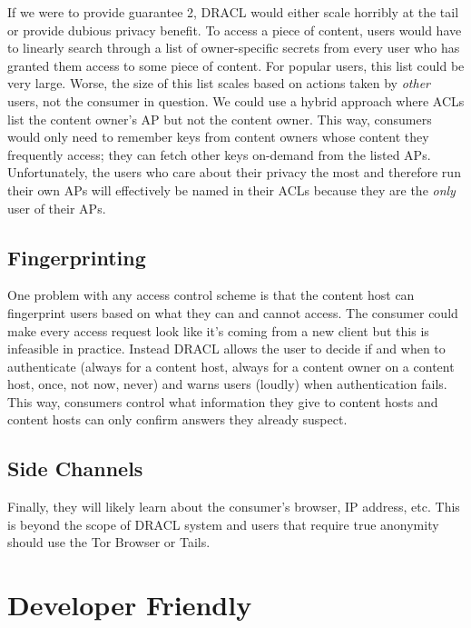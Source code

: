 \documentclass[pdftex,12pt,a4papaer]{report}
\begin{document}
\begin{compactenum}
If we were to provide guarantee 2, DRACL would either scale horribly at the tail
or provide dubious privacy benefit. To access a piece of content, users would
have to linearly search through a list of owner-specific secrets from every user
who has granted them access to some piece of content. For popular users, this
list could be very large. Worse, the size of this list scales based on actions
taken by \emph{other} users, not the consumer in question. We could use a hybrid
approach where ACLs list the content owner's AP but not the content owner. This
way, consumers would only need to remember keys from content owners whose
content they frequently access; they can fetch other keys on-demand from the
listed APs. Unfortunately, the users who care about their privacy the most and
therefore run their own APs will effectively be named in their ACLs because they
are the \emph{only} user of their APs.


\subsection{Fingerprinting}
\label{sub:fingerprinting}

One problem with any access control scheme is that the content host can
fingerprint users based on what they can and cannot access. The consumer could
make every access request look like it's coming from a new client but this is
infeasible in practice. Instead DRACL allows the user to decide if and when to
authenticate (always for a content host, always for a content owner on a content
host, once, not now, never) and warns users (loudly) when authentication fails.
This way, consumers control what information they give to content hosts and
content hosts can only confirm answers they already suspect.

\subsection{Side Channels}

Finally, they will likely learn about the consumer's browser, IP address, etc.
This is beyond the scope of DRACL system and users that require true anonymity
should use the Tor Browser\cite{todo} or Tails\cite{todo}.

\section{Developer Friendly}


\end{compactenum}
\end{document}
